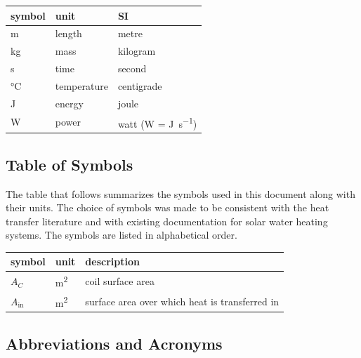 \documentclass[12pt]{article}
\begin{document}
\renewcommand{\arraystretch}{1.2}
  \noindent \begin{tabular}{l l l} 
    \toprule		
    \textbf{symbol} & \textbf{unit} & \textbf{SI}\\
    \midrule 
    \si{\metre} & length & metre\\
    \si{\kilogram} & mass	& kilogram\\
    \si{\second} & time & second\\
    \si{\celsius} & temperature & centigrade\\
    \si{\joule} & energy & joule\\
    \si{\watt} & power & watt (W = \si{\joule\per\second})\\
    \bottomrule
  \end{tabular}

\subsection{Table of Symbols}

The table that follows summarizes the symbols used in this document along with
their units.  The choice of symbols was made to be consistent with the heat
transfer literature and with existing documentation for solar water heating
systems.  The symbols are listed in alphabetical order.

\renewcommand{\arraystretch}{1.2}
\noindent \begin{longtable*}{l l p{12cm}} \toprule
\textbf{symbol} & \textbf{unit} & \textbf{description}\\
\midrule 
$A_C$ & \si[per-mode=symbol] {\square\metre} & coil surface area
\\
$A_\text{in}$ & \si[per-mode=symbol] {\square\metre} & surface area over 
which heat is transferred in
\\ 
\bottomrule
\end{longtable*}

\subsection{Abbreviations and Acronyms}
\end{document}
